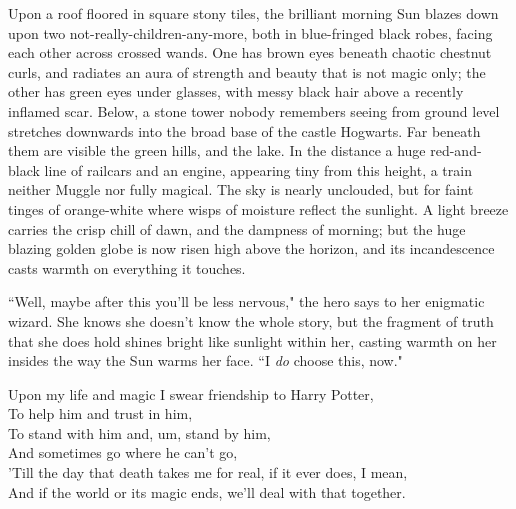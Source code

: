 \later

Upon a roof floored in square stony tiles, the brilliant morning Sun blazes down upon two not-really-children-any-more, both in blue-fringed black robes, facing each other across crossed wands. One has brown eyes beneath chaotic chestnut curls, and radiates an aura of strength and beauty that is not magic only; the other has green eyes under glasses, with messy black hair above a recently inflamed scar. Below, a stone tower nobody remembers seeing from ground level stretches downwards into the broad base of the castle Hogwarts. Far beneath them are visible the green hills, and the lake. In the distance a huge red-and-black line of railcars and an engine, appearing tiny from this height, a train neither Muggle nor fully magical. The sky is nearly unclouded, but for faint tinges of orange-white where wisps of moisture reflect the sunlight. A light breeze carries the crisp chill of dawn, and the dampness of morning; but the huge blazing golden globe is now risen high above the horizon, and its incandescence casts warmth on everything it touches.

``Well, maybe after this you'll be less nervous," the hero says to her enigmatic wizard. She knows she doesn't know the whole story, but the fragment of truth that she does hold shines bright like sunlight within her, casting warmth on her insides the way the Sun warms her face. ``I \emph{do} choose this, now."

\vspace{1\baselineskip}

\begin{em}
\noindent{}Upon my life and magic I swear friendship to Harry Potter,\\
To help him and trust in him,\\
To stand with him and, um, stand by him,\\
And sometimes go where he can't go,\\
'Till the day that death takes me for real, if it ever does, I mean,\\
And if the world or its magic ends, we'll deal with that together.
\end{em}

